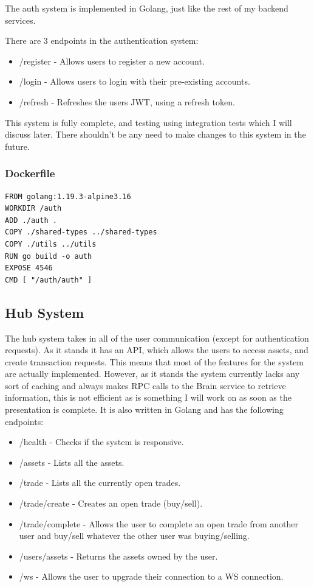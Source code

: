\documentclass[titlepage]{article}
\begin{document}
The auth system is implemented in Golang, just like the rest of my backend services.

There are 3 endpoints in the authentication system:
\begin{itemize}
  \item /register - Allows users to register a new account.
  \item /login - Allows users to login with their pre-existing accounts.
  \item /refresh - Refreshes the users JWT, using a refresh token.
\end{itemize}

This system is fully complete, and testing using integration tests which I will discuss later. There shouldn't be any need to make changes to this system in the future.

\subsubsection{Dockerfile}
\begin{verbatim}
FROM golang:1.19.3-alpine3.16
WORKDIR /auth
ADD ./auth .
COPY ./shared-types ../shared-types
COPY ./utils ../utils
RUN go build -o auth
EXPOSE 4546
CMD [ "/auth/auth" ]
\end{verbatim}

\subsection{Hub System}
The hub system takes in all of the user communication (except for authentication requests). As it stands it has an API, which allows the users to access assets, and create transaction requests. This means that most of the features for the system are actually implemented. However, as it stands the system currently lacks any sort of caching and always makes RPC calls to the Brain service to retrieve information, this is not efficient as is something I will work on as soon as the presentation is complete. It is also written in Golang and has the following endpoints:

\begin{itemize}
  \item /health - Checks if the system is responsive.
  \item /assets - Lists all the assets.
  \item /trade - Lists all the currently open trades.
  \item /trade/create - Creates an open trade (buy/sell).
  \item /trade/complete - Allows the user to complete an open trade from another user and buy/sell whatever the other user was buying/selling.
  \item /users/assets - Returns the assets owned by the user.
  \item /ws - Allows the user to upgrade their connection to a WS connection.
\end{itemize}
\end{document}
